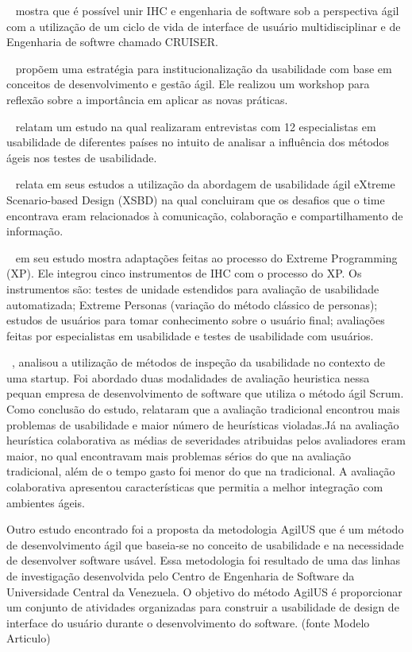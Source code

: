 ~ mostra que é possível unir IHC e engenharia de software sob a perspectiva ágil com a utilização de um ciclo de vida de interface de usuário multidisciplinar e de Engenharia de softwre chamado CRUISER.

~ propõem uma estratégia para institucionalização da usabilidade com base em conceitos de desenvolvimento e gestão ágil. Ele realizou um workshop para reflexão sobre a importância em aplicar as novas práticas.

~ relatam um estudo na qual realizaram entrevistas com 12 especialistas em usabilidade de diferentes países no intuito de analisar a influência dos métodos ágeis nos testes de usabilidade. 

~ relata em seus estudos a utilização da abordagem de usabilidade ágil eXtreme Scenario-based Design (XSBD) na qual concluiram que os desafios que o time encontrava eram relacionados à comunicação, colaboração e compartilhamento de informação.

~ em seu estudo mostra adaptações feitas ao processo do Extreme Programming (XP). Ele integrou cinco instrumentos de IHC com o processo do XP. Os instrumentos são: testes de unidade estendidos para avaliação de usabilidade automatizada; Extreme Personas (variação do método clássico de personas); estudos de usuários para tomar conhecimento sobre o usuário final; avaliações feitas por especialistas em usabilidade e testes de usabilidade com usuários.
 
~, analisou a utilização de métodos de inspeção da usabilidade no contexto de uma startup. Foi abordado duas modalidades de avaliação heuristica nessa pequan empresa de desenvolvimento de software que utiliza o método ágil Scrum. Como conclusão do estudo, relataram que a avaliação tradicional encontrou mais problemas de usabilidade e maior número de heurísticas violadas.Já na avaliação heurística colaborativa as médias de severidades atribuidas pelos avaliadores eram maior, no qual encontravam mais problemas sérios do que na avaliação tradicional, além de o tempo gasto foi menor do que na tradicional. A avaliação colaborativa apresentou características que permitia a melhor integração com ambientes ágeis.

	Outro estudo encontrado foi a proposta da metodologia AgilUS que é um método de desenvolvimento ágil que baseia-se no conceito de usabilidade e na necessidade de desenvolver software usável. Essa metodologia foi resultado de uma das linhas de investigação desenvolvida pelo Centro de Engenharia de Software da Universidade Central da Venezuela. O objetivo do método AgilUS é proporcionar um conjunto de atividades organizadas para construir a usabilidade de design de interface do usuário durante o desenvolvimento do software. (fonte Modelo Articulo)

